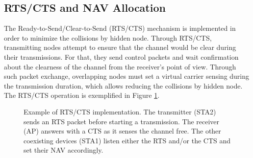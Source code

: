 \documentclass[a4paper]{article}
\begin{document}
	\subsection{RTS/CTS and NAV Allocation}
	The Ready-to-Send/Clear-to-Send (RTS/CTS) mechanism is implemented in order to minimize the collisions by hidden node. Through RTS/CTS, transmitting nodes attempt to ensure that the channel would be clear during their transmissions. For that, they send control packets and wait confirmation about the clearness of the channel from the receiver's point of view. Through such packet exchange, overlapping nodes must set a virtual carrier sensing during the transmission duration, which allows reducing the collisions by hidden node. The RTS/CTS operation is exemplified in Figure \ref{fig:rts_cts_mechanism}.
	\begin{figure}[h!]
		\centering
		\caption{Example of RTS/CTS implementation. The transmitter (STA2) sends an RTS packet before starting a transmission. The receiver (AP) answers with a CTS as it senses the channel free. The other coexisting devices (STA1) listen either the RTS and/or the CTS and set their NAV accordingly.}
		\label{fig:rts_cts_mechanism}
	\end{figure}	
		
\end{document}
